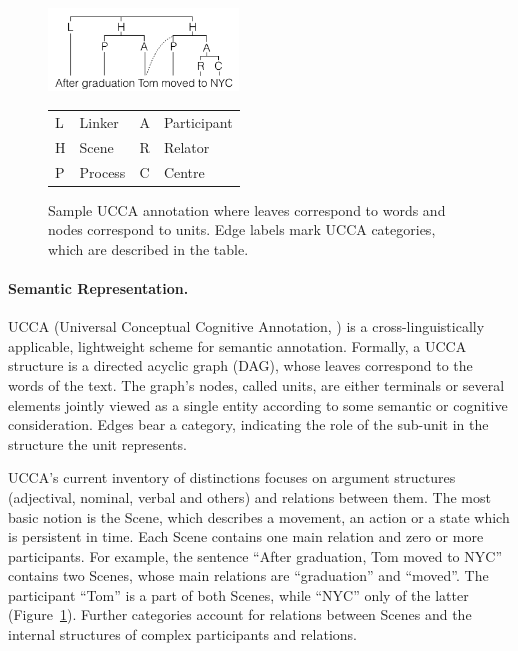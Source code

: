 \documentclass[11pt]{article}
\newcommand{\figref}[1]{Figure~\ref{#1}}
\def\inparcite#1{\newcite{#1}}
\begin{document}
\begin{figure}
    \begin{center}
    \includegraphics[width=0.45\textwidth]{ucca-tree-v2.png}

\begin{tabular}{|l|l|l|l|}
\hline
L & Linker &  A & Participant \\
H & Scene & R & Relator \\
P & Process & C & Centre \\
\hline
\end{tabular}
    \end{center}
\caption{\label{fig:ucca_example_v2}
  Sample UCCA annotation where leaves correspond to words and nodes correspond to units.
  Edge labels mark UCCA categories, which are described in the table.}
\end{figure}

\paragraph{Semantic Representation.}
UCCA (Universal Conceptual Cognitive Annotation, \inparcite{abend2013universal}) is a
cross-linguistically applicable, lightweight
scheme for semantic annotation. Formally, a UCCA structure is a directed acyclic graph (DAG),
whose leaves correspond to the words of the text.
The graph's nodes, called {\sc units}, are either terminals or several elements jointly
viewed as a single entity according to some semantic or cognitive consideration. Edges bear
a category, indicating the role of the sub-unit in the structure the unit
represents.

UCCA's current inventory of distinctions focuses on argument structures
(adjectival, nominal, verbal and others) and relations between them.
The most basic notion is the Scene, which describes a movement, an
action or a state which is persistent in time. Each Scene contains one main
relation and zero or more participants. For example, the sentence ``After graduation, Tom moved to NYC''
contains two Scenes, whose main relations are ``graduation'' and ``moved''.
The participant ``Tom'' is a part of both Scenes, while ``NYC'' only of the
latter (\figref{fig:ucca_example_v2}). Further categories account for
relations between Scenes and the internal structures of complex participants and relations.
\end{document}
